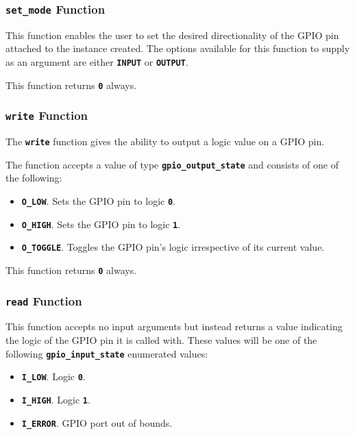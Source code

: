 \documentclass[a4paper, oneside, 11pt, titlepage, onecolumn, openright]{article}
\begin{document}
\subsubsection{\textbf{\texttt{set\_mode}} Function}
			\label{sss:HALset_modeFunction}
			This function enables the user to set the desired directionality of the GPIO pin attached to the instance created. The options available for this function to supply as an argument are either \textbf{\texttt{INPUT}} or \textbf{\texttt{OUTPUT}}.
			
			This function returns \textbf{\texttt{0}} always.
			
\subsubsection{\textbf{\texttt{write}} Function}
			\label{sss:HALwriteFunction}
			The \textbf{\texttt{write}} function gives the ability to output a logic value on a GPIO pin.
			
			The function accepts a value of type \textbf{\texttt{gpio\_output\_state}} and consists of one of the following:
			
\begin{itemize}
\item \textbf{\texttt{O\_LOW}}. Sets the GPIO pin to logic \textbf{\texttt{0}}.
\item \textbf{\texttt{O\_HIGH}}. Sets the GPIO pin to logic \textbf{\texttt{1}}.
\item \textbf{\texttt{O\_TOGGLE}}. Toggles the GPIO pin's logic irrespective of its current value.
\end{itemize}

This function returns \textbf{\texttt{0}} always.

\subsubsection{\textbf{\texttt{read}} Function}
			\label{sss:HALreadFunction}
			
			This function accepts no input arguments but instead returns a value indicating the logic of the GPIO pin it is called with. These values will be one of the following \textbf{\texttt{gpio\_input\_state}} enumerated values:
			
\begin{itemize}
\item \textbf{\texttt{I\_LOW}}. Logic \textbf{\texttt{0}}.
\item \textbf{\texttt{I\_HIGH}}. Logic \textbf{\texttt{1}}.
\item \textbf{\texttt{I\_ERROR}}. GPIO port out of bounds.
\end{itemize}
			
\end{document}
